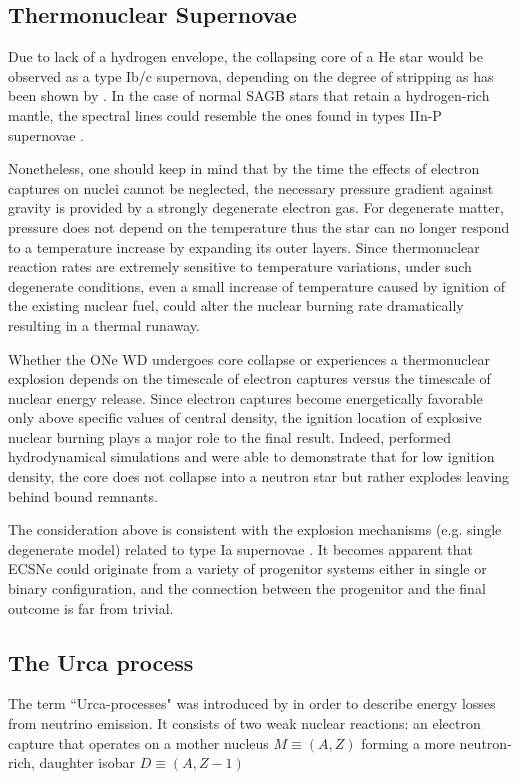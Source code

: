 \documentclass[../../main/thesis_msc.tex]{subfiles}
\begin{document}
\subsection{Thermonuclear Supernovae} \label{sec:thermonuclearSNe}
Due to lack of a hydrogen envelope, the collapsing core of a He star would be observed as a type Ib/c supernova, depending on the degree of stripping as has been shown by \cite{Tauris2013, Tauris_ultra}. In the case of normal SAGB stars that retain a hydrogen-rich mantle, the spectral lines could resemble the ones found in types IIn-P supernovae \citep[see][for details]{Moriya2014}.

Nonetheless, one should keep in mind that by the time the effects of electron captures on nuclei cannot be neglected, the necessary pressure gradient against gravity is provided by a strongly degenerate electron gas. For degenerate matter, pressure does not depend on the temperature thus the star can no longer respond to a temperature increase by expanding its outer layers. Since thermonuclear reaction rates are extremely sensitive to temperature variations, under such degenerate conditions, even a small increase of temperature caused by ignition of the existing nuclear fuel, could alter the nuclear burning rate dramatically resulting in a thermal runaway.

Whether the ONe WD undergoes core collapse or experiences a thermonuclear explosion depends on the timescale of electron captures versus the timescale of nuclear energy release. Since electron captures become energetically favorable only above specific values of central density, the ignition location of explosive nuclear burning plays a major role to the final result. Indeed, \cite{Jones2016, Jones:2018ule} performed hydrodynamical simulations and were able to demonstrate that for low ignition density, the core does not collapse into a neutron star but rather explodes leaving behind bound remnants.

The consideration above is consistent with the explosion mechanisms (e.g. single degenerate model) related to type Ia supernovae \citep[for recent reviews see][]{Hillebrandt2000, Wang2012, Wang2018, Livio:2018rue}. It becomes apparent that ECSNe could originate from a variety of progenitor systems either in single or binary configuration, and the connection between the progenitor and the final outcome is far from trivial.


\subsection{The Urca process}
The term ``Urca-processes" was introduced by \cite{Gamow1941} in order to describe energy losses from neutrino emission. It consists of two weak nuclear reactions: an electron capture that operates on a mother nucleus $M \equiv (A,Z)$ forming a more neutron-rich, daughter isobar $D \equiv (A,Z-1)$
\end{document}
